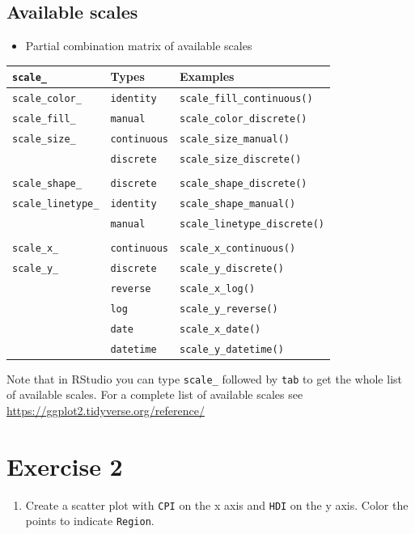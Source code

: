 \documentclass[]{book}
\providecommand{\tightlist}{%
  \setlength{\itemsep}{0pt}\setlength{\parskip}{0pt}}
\begin{document}
\hypertarget{available-scales}{%
\subsection{Available scales}\label{available-scales}}

\begin{itemize}
\tightlist
\item
  Partial combination matrix of available scales
\end{itemize}

\begin{longtable}[]{@{}lll@{}}
\toprule
\texttt{scale\_} & Types & Examples\tabularnewline
\midrule
\endhead
\texttt{scale\_color\_} & \texttt{identity} & \texttt{scale\_fill\_continuous()}\tabularnewline
\texttt{scale\_fill\_} & \texttt{manual} & \texttt{scale\_color\_discrete()}\tabularnewline
\texttt{scale\_size\_} & \texttt{continuous} & \texttt{scale\_size\_manual()}\tabularnewline
& \texttt{discrete} & \texttt{scale\_size\_discrete()}\tabularnewline
& &\tabularnewline
\texttt{scale\_shape\_} & \texttt{discrete} & \texttt{scale\_shape\_discrete()}\tabularnewline
\texttt{scale\_linetype\_} & \texttt{identity} & \texttt{scale\_shape\_manual()}\tabularnewline
& \texttt{manual} & \texttt{scale\_linetype\_discrete()}\tabularnewline
& &\tabularnewline
\texttt{scale\_x\_} & \texttt{continuous} & \texttt{scale\_x\_continuous()}\tabularnewline
\texttt{scale\_y\_} & \texttt{discrete} & \texttt{scale\_y\_discrete()}\tabularnewline
& \texttt{reverse} & \texttt{scale\_x\_log()}\tabularnewline
& \texttt{log} & \texttt{scale\_y\_reverse()}\tabularnewline
& \texttt{date} & \texttt{scale\_x\_date()}\tabularnewline
& \texttt{datetime} & \texttt{scale\_y\_datetime()}\tabularnewline
\bottomrule
\end{longtable}

Note that in RStudio you can type \texttt{scale\_} followed by \texttt{tab} to get the whole list of available scales.
For a complete list of available scales see \url{https://ggplot2.tidyverse.org/reference/}

\hypertarget{exercise-2-1}{%
\section{Exercise 2}\label{exercise-2-1}}

\begin{enumerate}
\def\labelenumi{\arabic{enumi}.}
\tightlist
\item
  Create a scatter plot with \texttt{CPI} on the x axis and \texttt{HDI} on the y axis. Color the points to indicate \texttt{Region}.
\end{enumerate}
\end{document}

